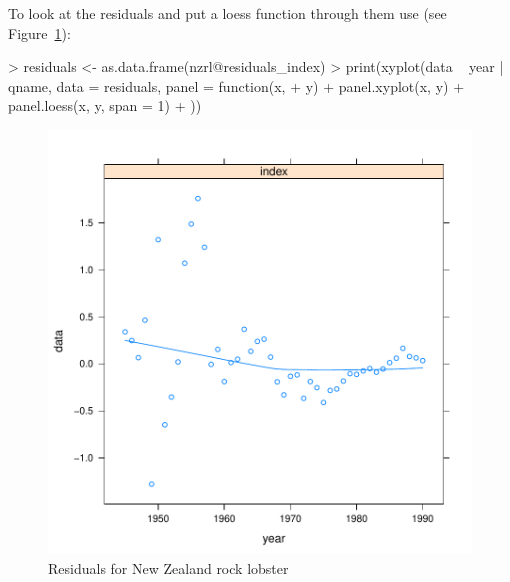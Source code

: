 \documentclass[a4paper]{article}
\begin{document}
To look at the residuals and put a loess function through them use (see Figure~\ref{fig:residuals_nzrl}):
\begin{center}
\begin{minipage}[H]{0.95\textwidth}%
\begin{shaded}%
\begin{Schunk}
\begin{Sinput}
> residuals <- as.data.frame(nzrl@residuals_index)
> print(xyplot(data ~ year | qname, data = residuals, panel = function(x, 
+     y) {
+     panel.xyplot(x, y)
+     panel.loess(x, y, span = 1)
+ }))
\end{Sinput}
\end{Schunk}
\end{shaded}%
\end{minipage}
\end{center}

\begin{figure}
\begin{center}
\includegraphics{flsp_man-nzrlresidplot}
\end{center}
\caption{Residuals for New Zealand rock lobster}
\label{fig:residuals_nzrl}
\end{figure}
\end{document}

